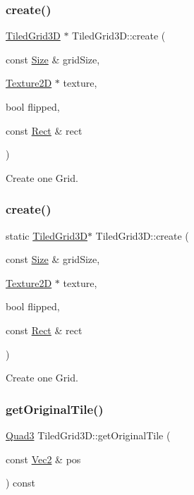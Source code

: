 \subsubsection{\texorpdfstring{create()}{create()}\hspace{0.1cm}{\footnotesize\ttfamily [7/8]}}
{\footnotesize\ttfamily \hyperlink{classTiledGrid3D}{Tiled\+Grid3D} $\ast$ Tiled\+Grid3\+D\+::create (\begin{DoxyParamCaption}\item[{const \hyperlink{classSize}{Size} \&}]{grid\+Size,  }\item[{\hyperlink{classTexture2D}{Texture2D} $\ast$}]{texture,  }\item[{bool}]{flipped,  }\item[{const \hyperlink{classRect}{Rect} \&}]{rect }\end{DoxyParamCaption})\hspace{0.3cm}{\ttfamily [static]}}

Create one Grid. \mbox{\label{classTiledGrid3D_a8261d121e2ed19042ee6672285c94491}} 
\subsubsection{\texorpdfstring{create()}{create()}\hspace{0.1cm}{\footnotesize\ttfamily [8/8]}}
{\footnotesize\ttfamily static \hyperlink{classTiledGrid3D}{Tiled\+Grid3D}$\ast$ Tiled\+Grid3\+D\+::create (\begin{DoxyParamCaption}\item[{const \hyperlink{classSize}{Size} \&}]{grid\+Size,  }\item[{\hyperlink{classTexture2D}{Texture2D} $\ast$}]{texture,  }\item[{bool}]{flipped,  }\item[{const \hyperlink{classRect}{Rect} \&}]{rect }\end{DoxyParamCaption})\hspace{0.3cm}{\ttfamily [static]}}

Create one Grid. \mbox{\label{classTiledGrid3D_a653e02adb803ade21b940dacb4da8e41}} 
\subsubsection{\texorpdfstring{get\+Original\+Tile()}{getOriginalTile()}\hspace{0.1cm}{\footnotesize\ttfamily [1/2]}}
{\footnotesize\ttfamily \hyperlink{structQuad3}{Quad3} Tiled\+Grid3\+D\+::get\+Original\+Tile (\begin{DoxyParamCaption}\item[{const \hyperlink{classVec2}{Vec2} \&}]{pos }\end{DoxyParamCaption}) const}

